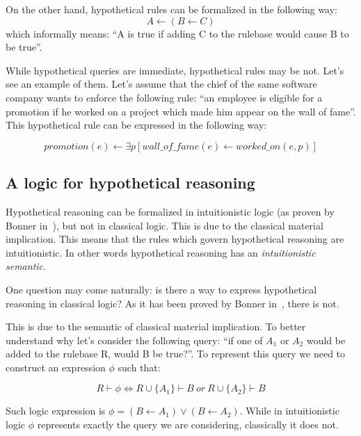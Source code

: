 On the other hand, hypothetical rules can be formalized in the following way:
\begin{equation}
  A \leftarrow (B \leftarrow C)
\end{equation}
which informally means: ``A is true if adding C to the rulebase would cause B to be true''.

While hypothetical queries are immediate, hypothetical rules may be not. Let's see an example
of them. Let's assume that the chief of the same software company
wants to enforce the following rule: ``an employee is eligible for a promotion if
he worked on a project which made him appear on the wall of fame''. This
hypothetical rule can be expressed in the following way:

\begin{equation}
  promotion(e) \leftarrow \exists p [wall\_of\_fame(e) \leftarrow worked\_on(e, p)]
\end{equation}

\subsection{A logic for hypothetical reasoning}
\label{sec:alfhr}
Hypothetical reasoning can be formalized in intuitionistic logic (as proven by
Bonner in~\cite{Bonner88alogic}), but not in classical logic. This is due to the
classical material implication. This means that the rules which govern hypothetical
reasoning are intuitionistic. In other words hypothetical reasoning has an
\textit{intuitionistic semantic}.

One question may come naturally: is there
a way to express hypothetical reasoning in classical logic?
As it has been proved by Bonner in~\cite{Bonner88alogic}, there is not.

This is due to the semantic of classical material implication. To better understand why
let's consider the following query:
``if one of $A_1$ or $A_2$ would be added
to the rulebase R, would B be true?''. To represent this query we need to construct
an expression $\phi$ such that:

\begin{equation}
  R \vdash \phi \iff R \cup \{A_1\} \vdash B\ or\ R \cup \{A_2\} \vdash B
\end{equation}

Such logic expression is $\phi = (B \leftarrow A_1) \lor (B \leftarrow A_2)$.
While in intuitionistic logic $\phi$ represents exactly the query
we are considering, classically it does not.

